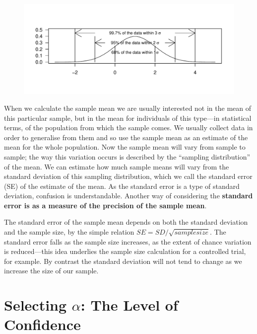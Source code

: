 \documentclass{tufte-handout}\usepackage[]{graphicx}\usepackage[]{color}
\makeatletter
\def\maxwidth{ %
  \ifdim\Gin@nat@width>\linewidth
    \linewidth
  \else
    \Gin@nat@width
  \fi
}
\newenvironment{knitrout}{}{} %
\makeatother
\begin{document}
\begin{figure}
\begin{knitrout}
\color{fgcolor}
\includegraphics[width=\maxwidth]{figure/unnamed-chunk-14-1} 

\end{knitrout}
\end{figure}

When we calculate the sample mean we are usually interested not in the mean of this particular sample, but in the mean for individuals of this type—in statistical terms, of the population from which the sample comes. We usually collect data in order to generalise from them and so use the sample mean as an estimate of the mean for the whole population. Now the sample mean will vary from sample to sample; the way this variation occurs is described by the ``sampling distribution'' of the mean. We can estimate how much sample means will vary from the standard deviation of this sampling distribution, which we call the standard error (SE) of the estimate of the mean. As the standard error is a type of standard deviation, confusion is understandable. Another way of considering the \textbf{standard error is as a measure of the precision of the sample mean}.

The standard error of the sample mean depends on both the standard deviation and the sample size, by the simple relation $SE = SD/\sqrt{sample size}$. The standard error falls as the sample size increases, as the extent of chance variation is reduced—this idea underlies the sample size calculation for a controlled trial, for example. By contrast the standard deviation will not tend to change as we increase the size of our sample.

\section{Selecting $\alpha$: The Level of Confidence}
\end{document}
